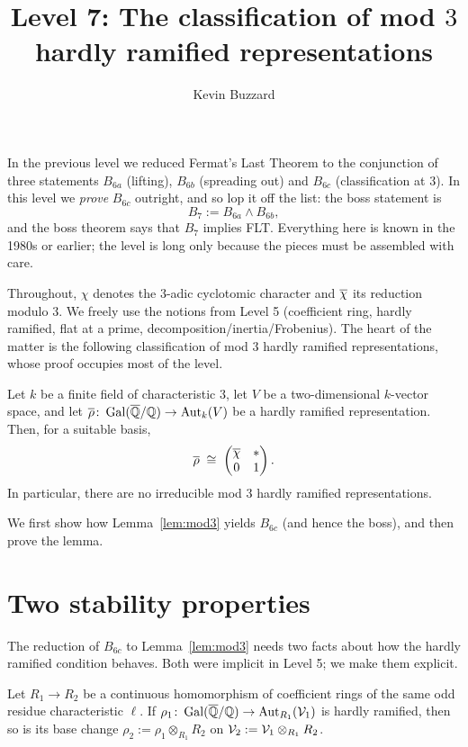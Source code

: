 \documentclass[11pt]{article}
\title{Level 7: The classification of mod $3$ hardly ramified representations}
\author{Kevin Buzzard}
\date{}
\begin{document}
\maketitle

\noindent
In the previous level we reduced Fermat's Last Theorem to the conjunction of
three statements $B_{6a}$ (lifting), $B_{6b}$ (spreading out) and $B_{6c}$
(classification at $3$). In this level we \emph{prove} $B_{6c}$ outright, and so
lop it off the list: the boss statement is
\[
  B_7 := B_{6a}\wedge B_{6b},
\]
and the boss theorem says that $B_7$ implies FLT. Everything here is known in
the 1980s or earlier; the level is long only because the pieces must be
assembled with care.

\medskip\noindent
Throughout, $\chi$ denotes the $3$-adic cyclotomic character and $\overline{\chi}$ its
reduction modulo $3$. We freely use the notions from Level 5 (coefficient
ring, hardly ramified, flat at a prime, decomposition/inertia/Frobenius). The
heart of the matter is the following classification of mod $3$ hardly ramified
representations, whose proof occupies most of the level.

\begin{lemma}\label{lem:mod3}
Let $k$ be a finite field of characteristic $3$, let $V$ be a two-dimensional
$k$-vector space, and let $\overline{\rho}\colon\operatorname{Gal}(\overline{\mathbb{Q}}/\mathbb{Q})\to\operatorname{Aut}_k(V)$ be a hardly ramified
representation. Then, for a suitable basis,
\[
  \overline{\rho}\;\cong\;\begin{pmatrix}\overline{\chi} & * \\ 0 & 1\end{pmatrix}.
\]
In particular, there are no irreducible mod $3$ hardly ramified
representations.
\end{lemma}

We first show how Lemma~\ref{lem:mod3} yields $B_{6c}$ (and hence the boss),
and then prove the lemma.

\section{Two stability properties}

The reduction of $B_{6c}$ to Lemma~\ref{lem:mod3} needs two facts about how
the hardly ramified condition behaves. Both were implicit in Level 5; we make
them explicit.

\begin{proposition}\label{prop:basechange}
Let $R_1\to R_2$ be a continuous homomorphism of coefficient rings of the same
odd residue characteristic $\ell$. If $\rho_1\colon\operatorname{Gal}(\overline{\mathbb{Q}}/\mathbb{Q})\to\operatorname{Aut}_{R_1}(\mathcal{V}_1)$ is
hardly ramified, then so is its base change
$\rho_2:=\rho_1\otimes_{R_1}R_2$ on $\mathcal{V}_2:=\mathcal{V}_1\otimes_{R_1}R_2$.
\end{proposition}
\end{document}
